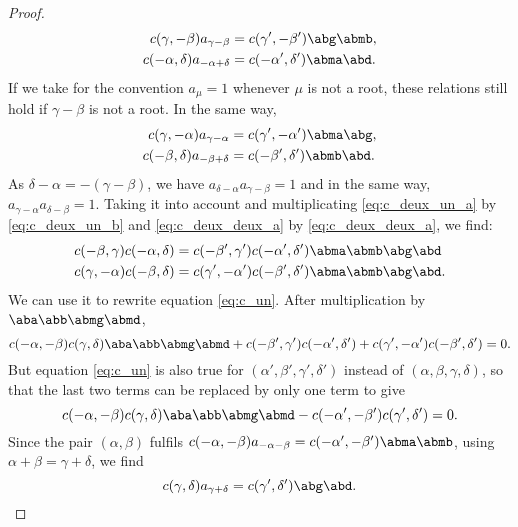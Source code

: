 \begin{proof}
	\begin{subequations}\label{eq:c_deux_un}
		\begin{align}
			c(\gamma,-\beta)a_{\gamma-\beta}    & =c(\gamma',-\beta')\abg\abmb,  \label{eq:c_deux_un_a} \\
			c(-\alpha,\delta)a_{-\alpha+\delta} & =c(-\alpha',\delta')\abma\abd.\label{eq:c_deux_un_b}
		\end{align}
	\end{subequations}
	If we take for the convention $a_{\mu}=1$ whenever $\mu$ is not a root, these relations still hold if $\gamma-\beta$ is not a root. In the same way,
	\begin{subequations}\label{eq:c_deux_deux}
		\begin{align}
			c(\gamma,-\alpha)a_{\gamma-\alpha} & =c(\gamma',-\alpha')\abma\abg,\label{eq:c_deux_deux_a} \\
			c(-\beta,\delta)a_{-\beta+\delta}  & =c(-\beta',\delta')\abmb\abd.\label{eq:c_deux_deux_b}
		\end{align}
	\end{subequations}
	As $\delta-\alpha=-(\gamma-\beta)$, we have $a_{\delta-\alpha}a_{\gamma-\beta}=1$ and in the same way, $a_{\gamma-\alpha}a_{\delta-\beta}=1$. Taking it into account and multiplicating \eqref{eq:c_deux_un_a} by \eqref{eq:c_deux_un_b} and \eqref{eq:c_deux_deux_a} by \eqref{eq:c_deux_deux_a}, we find:
	\begin{subequations}\label{eq:c_deux_trois}
		\begin{align}
			c(-\beta,\gamma)c(-\alpha,\delta) & =c(-\beta',\gamma')c(-\alpha',\delta')\abma\abmb\abg\abd\label{eq:c_deux_trois_a} \\
			c(\gamma,-\alpha)c(-\beta,\delta) & =c(\gamma',-\alpha')c(-\beta',\delta')\abma\abmb\abg\abd.
		\end{align}
	\end{subequations}
	We can use it to rewrite equation \eqref{eq:c_un}. After multiplication by $\aba\abb\abmg\abmd$,
	\begin{equation}
		c(-\alpha,-\beta)c(\gamma,\delta)\aba\abb\abmg\abmd+c(-\beta',\gamma')c(-\alpha',\delta')+c(\gamma',-\alpha')c(-\beta',\delta')=0.
	\end{equation}
	But equation \eqref{eq:c_un} is also true for $(\alpha',\beta',\gamma',\delta')$ instead of $(\alpha,\beta,\gamma,\delta)$, so that the last two terms can be replaced by only one term to give
	\[
		c(-\alpha,-\beta)c(\gamma,\delta)\aba\abb\abmg\abmd-c(-\alpha',-\beta')c(\gamma',\delta')=0.
	\]
	Since the pair $(\alpha,\beta)$ fulfils $c(-\alpha,-\beta)a_{-\alpha-\beta}=c(-\alpha',-\beta')\abma\abmb$, using $\alpha+\beta=\gamma+\delta$, we find
	\[
		c(\gamma,\delta)a_{\gamma+\delta}=c(\gamma',\delta')\abg\abd.
	\]

\end{proof}


